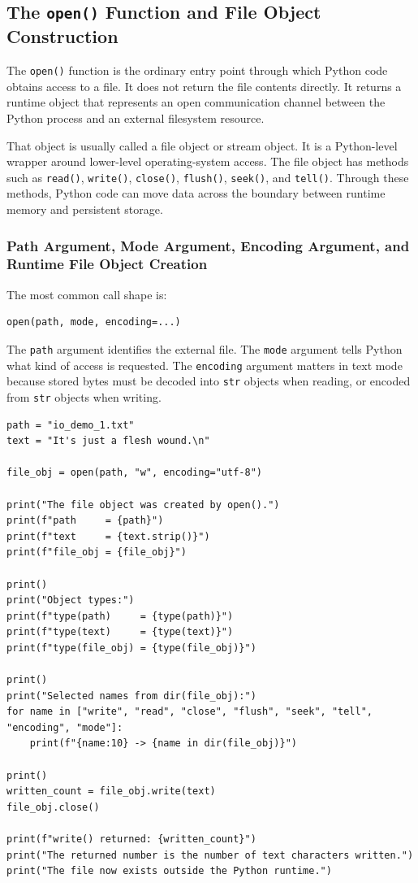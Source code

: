 \subsection{The \texttt{open()} Function and File Object Construction}

The \texttt{open()} function is the ordinary entry point through which Python code obtains access to a file. It does not return the file contents directly. It returns a runtime object that represents an open communication channel between the Python process and an external filesystem resource.

That object is usually called a file object or stream object. It is a Python-level wrapper around lower-level operating-system access. The file object has methods such as \texttt{read()}, \texttt{write()}, \texttt{close()}, \texttt{flush()}, \texttt{seek()}, and \texttt{tell()}. Through these methods, Python code can move data across the boundary between runtime memory and persistent storage.

\subsubsection{Path Argument, Mode Argument, Encoding Argument, and Runtime File Object Creation}

The most common call shape is:

\begin{verbatim}
open(path, mode, encoding=...)
\end{verbatim}

The \texttt{path} argument identifies the external file. The \texttt{mode} argument tells Python what kind of access is requested. The \texttt{encoding} argument matters in text mode because stored bytes must be decoded into \texttt{str} objects when reading, or encoded from \texttt{str} objects when writing.

\begin{verbatim}
path = "io_demo_1.txt"
text = "It's just a flesh wound.\n"

file_obj = open(path, "w", encoding="utf-8")

print("The file object was created by open().")
print(f"path     = {path}")
print(f"text     = {text.strip()}")
print(f"file_obj = {file_obj}")

print()
print("Object types:")
print(f"type(path)     = {type(path)}")
print(f"type(text)     = {type(text)}")
print(f"type(file_obj) = {type(file_obj)}")

print()
print("Selected names from dir(file_obj):")
for name in ["write", "read", "close", "flush", "seek", "tell", "encoding", "mode"]:
    print(f"{name:10} -> {name in dir(file_obj)}")

print()
written_count = file_obj.write(text)
file_obj.close()

print(f"write() returned: {written_count}")
print("The returned number is the number of text characters written.")
print("The file now exists outside the Python runtime.")
\end{verbatim}

